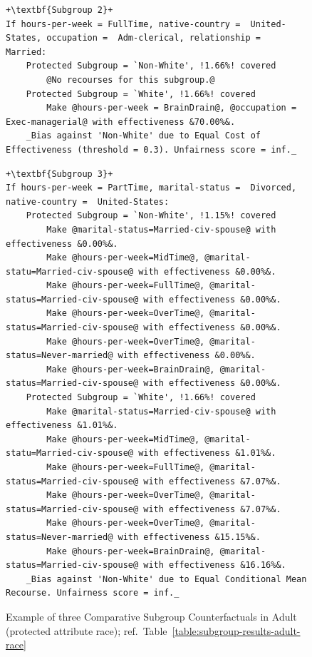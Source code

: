 \documentclass{article}
\begin{document}
\begin{figure}[ht]
\begin{minipage}{1\linewidth}
\begin{lstlisting}[style = base,escapechar=+]
+\textbf{Subgroup 2}+
If hours-per-week = FullTime, native-country =  United-States, occupation =  Adm-clerical, relationship =  Married:
    Protected Subgroup = `Non-White', !1.66%! covered
        @No recourses for this subgroup.@
    Protected Subgroup = `White', !1.66%! covered
        Make @hours-per-week = BrainDrain@, @occupation =  Exec-managerial@ with effectiveness &70.00%&.
    _Bias against 'Non-White' due to Equal Cost of Effectiveness (threshold = 0.3). Unfairness score = inf._
\end{lstlisting}

\begin{lstlisting}[style = base,escapechar=+]
+\textbf{Subgroup 3}+
If hours-per-week = PartTime, marital-status =  Divorced, native-country =  United-States:
    Protected Subgroup = `Non-White', !1.15%! covered
        Make @marital-status=Married-civ-spouse@ with effectiveness &0.00%&.
        Make @hours-per-week=MidTime@, @marital-statu=Married-civ-spouse@ with effectiveness &0.00%&.
        Make @hours-per-week=FullTime@, @marital-status=Married-civ-spouse@ with effectiveness &0.00%&.
        Make @hours-per-week=OverTime@, @marital-status=Married-civ-spouse@ with effectiveness &0.00%&.
        Make @hours-per-week=OverTime@, @marital-status=Never-married@ with effectiveness &0.00%&.
        Make @hours-per-week=BrainDrain@, @marital-status=Married-civ-spouse@ with effectiveness &0.00%&.
    Protected Subgroup = `White', !1.66%! covered
        Make @marital-status=Married-civ-spouse@ with effectiveness &1.01%&.
        Make @hours-per-week=MidTime@, @marital-statu=Married-civ-spouse@ with effectiveness &1.01%&.
        Make @hours-per-week=FullTime@, @marital-status=Married-civ-spouse@ with effectiveness &7.07%&.
        Make @hours-per-week=OverTime@, @marital-status=Married-civ-spouse@ with effectiveness &7.07%&.
        Make @hours-per-week=OverTime@, @marital-status=Never-married@ with effectiveness &15.15%&.
        Make @hours-per-week=BrainDrain@, @marital-status=Married-civ-spouse@ with effectiveness &16.16%&.
    _Bias against 'Non-White' due to Equal Conditional Mean Recourse. Unfairness score = inf._
\end{lstlisting}

\caption{Example of three Comparative Subgroup Counterfactuals in Adult (protected attribute race); ref.\ Table~\ref{table:subgroup-results-adult-race}}
\label{fig:comparative-subgroup-counterfactuals-adult-race}
\end{minipage}
\end{figure}
\end{document}
